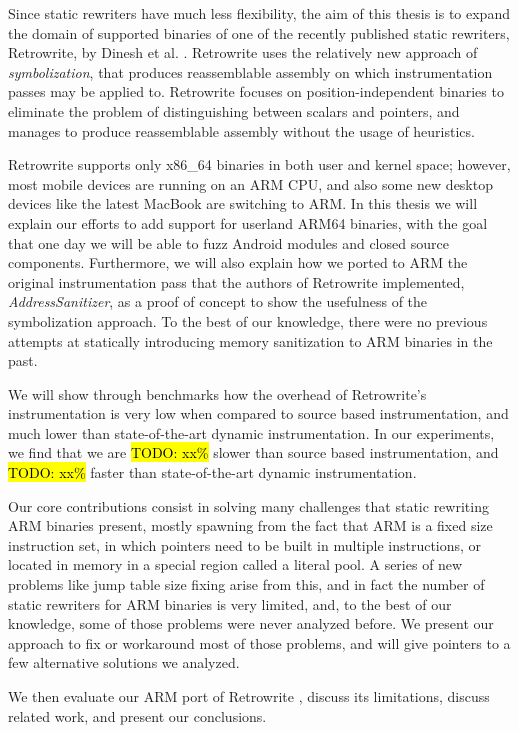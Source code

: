 \documentclass[a4paper,11pt,oneside]{report}
\newcommand{\todo}[1]{%
	\begingroup 
	\sethlcolor{cyan}%
	\hl{TODO: #1}%
	\endgroup
}
\begin{document}
Since static rewriters have much less flexibility, the aim of this thesis is to 
expand the domain of supported binaries of one of the recently published static 
rewriters, Retrowrite, by Dinesh et al. \cite{dinesh20oakland}. Retrowrite uses 
the relatively new approach of \emph{symbolization}, that produces 
reassemblable assembly on which instrumentation passes may be applied to.  
Retrowrite focuses on position-independent binaries to eliminate the problem of 
distinguishing between scalars and pointers, and manages to produce 
reassemblable assembly without the usage of heuristics. 

Retrowrite supports only x86\_64 binaries in both user and kernel space; 
however, most mobile devices are running on an ARM CPU, and also some new 
desktop devices like the latest MacBook are switching to ARM. In this thesis we 
will explain our efforts to add support for userland ARM64 binaries, with the 
goal that one day we will be able to fuzz Android modules and closed source 
components. Furthermore, we will also explain how we ported to ARM the original 
instrumentation pass that the authors of Retrowrite implemented, 
\emph{AddressSanitizer}, as a proof of concept to show the usefulness of the 
symbolization approach. To the best of our knowledge, there were no previous 
attempts at statically introducing memory sanitization to ARM binaries in the 
past. 

We will show through benchmarks how the overhead of Retrowrite's 
instrumentation is very low when compared to source based instrumentation, and 
much lower than state-of-the-art dynamic instrumentation. In our experiments, 
we find that we are \todo{xx\%} slower than source based instrumentation, and 
\todo{xx\%} faster than state-of-the-art dynamic instrumentation.

Our core contributions consist in solving many challenges that static rewriting 
ARM binaries present, mostly spawning from the fact that ARM is a fixed size 
instruction set, in which pointers need to be built in multiple instructions, 
or located in memory in a special region called a literal pool. A series of new 
problems like jump table size fixing arise from this, and in fact the number of 
static rewriters for ARM binaries is very limited, and, to the best of our 
knowledge, some of those problems were never analyzed before.  We present our 
approach to fix or workaround most of those problems, and will give pointers to 
a few alternative solutions we analyzed.

We then evaluate our ARM port of Retrowrite , discuss its limitations, discuss 
related work, and present our conclusions.
\end{document}
